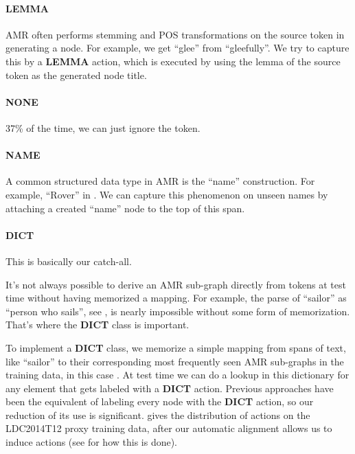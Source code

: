 \documentclass[11pt]{article}
\begin{document}
\paragraph{LEMMA} AMR often performs stemming and POS transformations on the source token in generating a node. 
For example, we get ``glee'' from ``gleefully''.
We try to capture this by a \textbf{LEMMA} action, which is executed by using the lemma of the source token as the generated node title.
\paragraph{NONE} 37\% of the time, we can just ignore the token.
\paragraph{NAME} A common structured data type in AMR is the ``name'' construction. 
For example, ``Rover'' in .
We can capture this phenomenon on unseen names by attaching a created ``name'' node to the top of this span.
\paragraph{DICT} This is basically our catch-all. 


It's not always possible to derive an AMR sub-graph directly from tokens at test time without having memorized a mapping. For example, the parse of ``sailor'' as ``person who sails'', see , is nearly impossible without some form of memorization. That's where the \textbf{DICT} class is important.

To implement a \textbf{DICT} class, we memorize a simple mapping from spans of text, like ``sailor'' to their corresponding most frequently seen AMR sub-graphs in the training data, in this case . At test time we can do a lookup in this dictionary for any element that gets labeled with a \textbf{DICT} action. Previous approaches have been the equivalent of labeling every node with the \textbf{DICT} action, so our reduction of its use is significant.  gives the distribution of actions on the LDC2014T12 proxy training data, after our automatic alignment allows us to induce actions (see  for how this is done).
\end{document}

